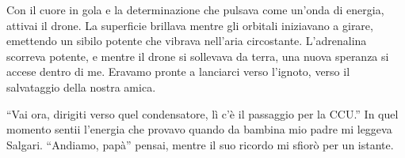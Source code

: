 Con il cuore in gola e la determinazione che pulsava come un'onda di energia, attivai il drone. La superficie  brillava mentre gli orbitali iniziavano a girare, emettendo un sibilo potente che vibrava nell'aria circostante. L'adrenalina scorreva potente, e mentre il drone si sollevava da terra, una nuova speranza si accese dentro di me. Eravamo pronte a lanciarci verso l'ignoto, verso il salvataggio della nostra amica.

\begin{dialogue}
 \enquote{Vai ora, dirigiti verso quel condensatore, lì c'è il passaggio per la CCU.} In quel momento sentii l'energia che provavo quando da bambina mio padre mi leggeva Salgari. ``Andiamo, papà'' pensai, mentre il suo ricordo mi sfiorò per un istante.
\end{dialogue}
